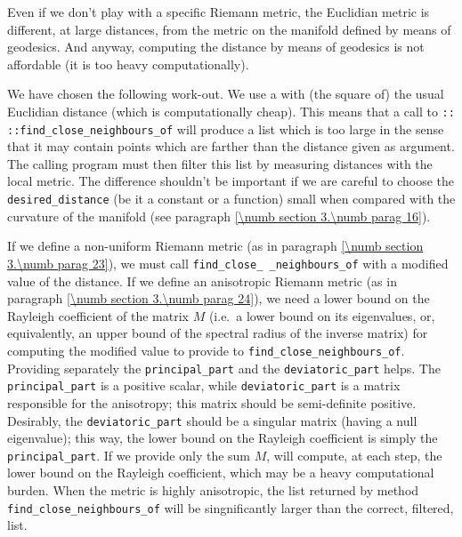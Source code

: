 Even if we don't play with a specific Riemann metric, the Euclidian metric is different,
at large distances, from the metric on the manifold defined by means of geodesics.
And anyway, computing the distance by means of geodesics is not affordable (it is too heavy
computationally).

We have chosen the following work-out.
We use a {\small\tt{}} with (the square of) the usual Euclidian distance (which is
computationally cheap).
This means that a call to {\small\tt{}:: ::find\_close\_neighbours\_of}
will produce a list which is too large in the sense that it may contain points which are
farther than the distance given as argument.
The calling program must then filter this list by measuring distances with the local metric.
The difference shouldn't be important if we are careful to choose the {\small\tt
desired\_distance} (be it a constant or a function) small when compared with the curvature
of the manifold (see paragraph \ref{\numb section 3.\numb parag 16}).

If we define a non-uniform Riemann metric
(as in paragraph \ref{\numb section 3.\numb parag 23}),
we must call {\small\tt find\_close\_ \_neighbours\_of} with a modified value of the
distance.
If we define an anisotropic Riemann metric
(as in paragraph \ref{\numb section 3.\numb parag 24}),
we need a lower bound on the Rayleigh coefficient of the matrix $M$ (i.e.\ a lower bound
on its eigenvalues, or, equivalently, an upper bound of the spectral radius of the inverse
matrix) for computing the modified value to provide to {\small\tt find\_close\_neighbours\_of}.
Providing separately the {\small\tt principal\_part} and the {\small\tt deviatoric\_part} helps.
The {\small\tt principal\_part} is a positive scalar, while {\small\tt deviatoric\_part} is
a matrix responsible for the anisotropy; this matrix should be semi-definite positive.
Desirably, the {\small\tt deviatoric\_part} should be a singular matrix (having a null eigenvalue);
this way, the lower bound on the Rayleigh coefficient is simply the {\small\tt principal\_part}.
If we provide only the sum $M$, {\maniFEM} will compute, at each step, the lower bound on the
Rayleigh coefficient, which may be a heavy computational burden.
When the metric is highly anisotropic, the list returned by method
{\small\tt find\_close\_neighbours\_of} will be singnificantly larger than the correct, filtered, list.


